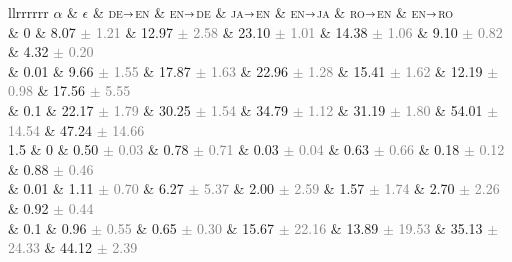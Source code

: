 \begin{code}
    \newcommand{\langp}[2]{\textsc{#1}$\shortrightarrow$\textsc{#2}}
    \newcommand{\std}[1]{\footnotesize\textcolor{gray}{#1}}
    
    \begin{itabular}{llrrrrrr}
        \toprule
        $\alpha$ & $\epsilon$ & \langp{de}{en} & \langp{en}{de} & \langp{ja}{en} & \langp{en}{ja} & \langp{ro}{en} & \langp{en}{ro}\\
         & 0 & 8.07 \std{$\pm$ 1.21} & 12.97 \std{$\pm$ 2.58} & 23.10 \std{$\pm$ 1.01} & 14.38 \std{$\pm$ 1.06} & 9.10 \std{$\pm$ 0.82} & 4.32 \std{$\pm$ 0.20}\\
         & 0.01 & 9.66 \std{$\pm$ 1.55} & 17.87 \std{$\pm$ 1.63} & 22.96 \std{$\pm$ 1.28} & 15.41 \std{$\pm$ 1.62} & 12.19 \std{$\pm$ 0.98} & 17.56 \std{$\pm$ 5.55}\\
         & 0.1 & 22.17 \std{$\pm$ 1.79} & 30.25 \std{$\pm$ 1.54} & 34.79 \std{$\pm$ 1.12} & 31.19 \std{$\pm$ 1.80} & 54.01 \std{$\pm$ 14.54} & 47.24 \std{ $\pm$ 14.66}\\
        1.5 & 0 & 0.50 \std{$\pm$ 0.03} & 0.78 \std{$\pm$ 0.71} & 0.03 \std{$\pm$ 0.04} & 0.63 \std{$\pm$ 0.66} & 0.18 \std{$\pm$ 0.12} & 0.88 \std{$\pm$ 0.46}\\
        & 0.01 & 1.11 \std{$\pm$ 0.70} & 6.27 \std{$\pm$ 5.37} & 2.00 \std{$\pm$ 2.59} & 1.57 \std{$\pm$ 1.74} & 2.70 \std{$\pm$ 2.26} & 0.92 \std{$\pm$ 0.44}\\
        & 0.1 & 0.96 \std{$\pm$ 0.55} & 0.65 \std{$\pm$ 0.30} & 15.67 \std{$\pm$ 22.16} & 13.89 \std{$\pm$ 19.53} & 35.13 \std{$\pm$ 24.33} & 44.12 \std{$\pm$ 2.39}\\
        \bottomrule
    \end{itabular}
\end{code}

\newpage






\tasksix

